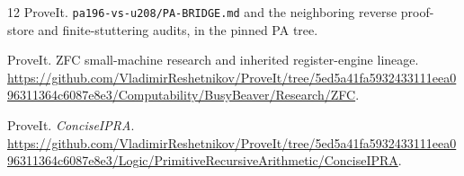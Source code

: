 \documentclass[11pt,letterpaper]{article}
\newcommand{\file}[1]{\texttt{\nolinkurl{#1}}}
\begin{document}
\begin{thebibliography}{12}
ProveIt. \file{pa196-vs-u208/PA-BRIDGE.md} and the neighboring
reverse proof-store and finite-stuttering audits, in the pinned PA tree.

ProveIt. ZFC small-machine research and inherited register-engine lineage.
\url{https://github.com/VladimirReshetnikov/ProveIt/tree/5ed5a41fa5932433111eea096311364c6087e8e3/Computability/BusyBeaver/Research/ZFC}.

ProveIt. \emph{ConciseIPRA}.
\url{https://github.com/VladimirReshetnikov/ProveIt/tree/5ed5a41fa5932433111eea096311364c6087e8e3/Logic/PrimitiveRecursiveArithmetic/ConciseIPRA}.
\end{thebibliography}
\end{document}

